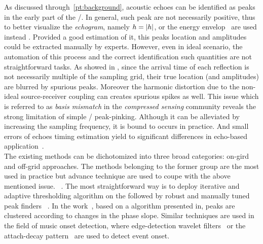 As discussed through~\cref{pt:background}, acoustic echoes can be identified as peaks in the early part of the \RIR/.
In general, such peak are not necessarily positive, thus to better visualize the \textit{echogram}, namely $h = |{h}|$, or the energy envelop~ are used instead%
.
Provided a good estimation of it, this peaks location and amplitudes could be extracted manually by experts.
However, even in ideal scenario, the automation of this process and the correct identification such quantities are not straightforward tasks.
As showed in , since the arrival time of each reflection is not necessarily multiple of the sampling grid, their true location (and amplitudes) are blurred by spurious peaks.
Moreover the harmonic distortion due to the non-ideal source-receiver coupling can creates spurious spikes as well.
This issue which is referred to as \textit{basis mismatch} in the \textit{compressed sensing} community reveals the strong limitation of simple \RIR/ peak-pinking.
Although it can be alleviated by increasing the sampling frequency, it is bound to occurs in practice.
And small errors of echoes timing estimation yield to significant differences in echo-based application~\cite{defrance2008finding}.
\\The existing methods can be dichotomized into three broad categories: on-gird and off-grid approaches.
The methods belonging to the former group are the most used in practice but advance technique are used to coupe with the above mentioned issue.
~.
The most straightforward way is to deploy iterative and adaptive thresholding algorithm on the followed by robust and manually tuned peak finders ~.
In the work~, based on a algorithm presented in, peaks are clustered according to changes in the phase slope.
Similar techniques are used in the field of music onset detection, where edge-detection wavelet filters~ or the attach-decay pattern~ are used to detect event onset.

